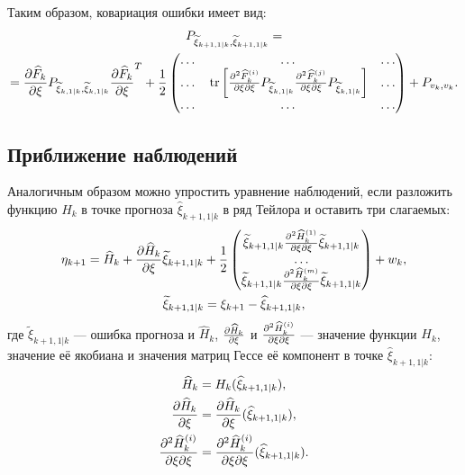 Таким образом, ковариация ошибки имеет вид:
\begin{multline} \label{equation:filtering:in_states:extended_kalman:prediction_error_covariance}
    P_{\widetilde{\xi}_{k+1,1|k}, \widetilde{\xi}_{k+1,1|k}} = \\
    = \frac{\partial \widehat{F}_k}{\partial \xi} P_{\widetilde{\xi}_{k,1|k}, \widetilde{\xi}_{k,1|k}} \frac{\partial \widehat{F}_k}{\partial \xi}^T
        + \frac{1}{2}
            \begin{pmatrix}
                \dots & \dots & \dots \\
                \dots & \mathrm{tr} \left [ \frac{\partial^2 \widehat{F}_k^{(i)}}{{\partial \xi}{\partial \xi}} P_{\widetilde{\xi}_{k,1|k}} \frac{\partial^2 \widehat{F}_k^{(j)}}{{\partial \xi}{\partial \xi}} P_{\widetilde{\xi}_{k,1|k}} \right ] & \dots \\
                \dots & \dots & \dots
            \end{pmatrix}
        + P_{v_k, v_k}
    .
\end{multline}

\subsection{Приближение наблюдений}

Аналогичным образом можно упростить уравнение наблюдений, если разложить функцию $H_k$ в точке прогноза $\widehat{\xi}_{k+1,1|k}$ в ряд Тейлора и оставить три
слагаемых:
\begin{gather*}
    \eta_{k+1}
        = \widehat{H}_k
        + \frac{\partial \widehat{H}_k}{\partial \xi} \widetilde{\xi}_{k+1,1|k}
        + \frac{1}{2}
            \begin{pmatrix}
                \widetilde{\xi}_{k+1,1|k} \frac{\partial^2 \widehat{H}_k^{(1)}}{{\partial \xi}{\partial \xi}} \widetilde{\xi}_{k+1,1|k} \\
                \dots \\
                \widetilde{\xi}_{k+1,1|k} \frac{\partial^2 \widehat{H}_k^{(m)}}{{\partial \xi}{\partial \xi}} \widetilde{\xi}_{k+1,1|k}
            \end{pmatrix}
        + w_k, \\
    \widetilde{\xi}_{k+1,1|k} = \xi_{k+1} - \widehat{\xi}_{k+1,1|k}
    ,
\end{gather*}
где $\widetilde{\xi}_{k+1,1|k}$ --- ошибка прогноза и $\widehat{H}_k$, $\frac{\partial \widehat{H}_k}{\partial \xi}$ и $\frac{\partial^2 \widehat{H}_k^{(i)}}{{\partial \xi}{\partial \xi}}$ --- значение функции $H_k$,
значение её якобиана и значения матриц Гессе её компонент в точке $\widehat{\xi}_{k+1,1|k}$:
\begin{align*}
    \widehat{H}_k                         & = H_k ( \widehat{\xi}_{k+1,1|k} ) , \\
    \frac{\partial \widehat{H}_k}{\partial \xi}           & = \frac{\partial \widehat{H}_k}{\partial \xi} ( \widehat{\xi}_{k+1,1|k} ), \\
    \frac{\partial^2 \widehat{H}_k^{(i)}}{{\partial \xi}{\partial \xi}} & = \frac{\partial^2 \widehat{H}_k^{(i)}}{{\partial \xi}{\partial \xi}} ( \widehat{\xi}_{k+1,1|k} )
    .
\end{align*}

